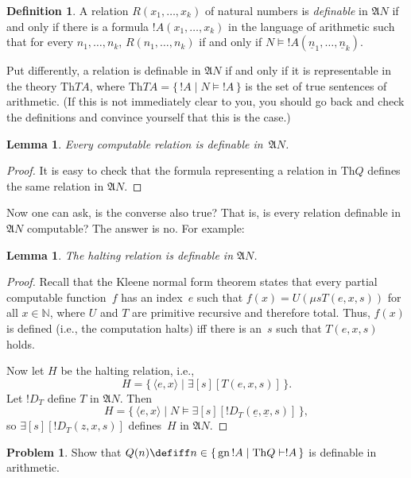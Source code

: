\documentclass[10pt,a4paper]{article}
\theoremstyle{plain}
\newtheorem{lem}[thm]{Lemma}
\theoremstyle{definition}
\newtheorem{defn}[thm]{Definition}
\newtheorem{prob}{Problem}[section]
\theoremstyle{remark}
\providecommand{\lexists}{\mathord{\exists}}
\providecommand{\Proves}{\mathrel{\vdash}}
\providecommand{\Struct}{\ensuremath{\mathfrak{A}}}
\providecommand{\Sat}[2]{\ensuremath{#1 \models #2}}
\providecommand{\Th}{\ensuremath{\mathrm{Th}}}
\providecommand{\tuple}[1]{\langle #1 \rangle}
\providecommand{\num}[1]{\underline{#1}}
\providecommand{\Nat}{\ensuremath{\mathbb{N}}}
\providecommand{\Setabs}[2]{\{\, #1 \mid #2 \,\}}
\providecommand{\Gn}{\operatorname{gn}}
\providecommand{\umin}{\mu}
\begin{document}
\begin{defn}
A relation $R(x_1,\dots,x_k)$ of natural numbers is \emph{definable}
in $\Struct{N}$ if and only if there is a formula $!A(x_1,\dots,x_k)$
in the language of arithmetic such that for every $n_1,\dots,n_k$,
$R(n_1,\dots,n_k)$ if and only if $\Sat{N}{!A(\num n_1,\dots,\num
  n_k)}$.
\end{defn}

Put differently, a relation is definable in $\Struct{N}$ if and
only if it is representable in the theory $\Th{TA}$, where $\Th{TA} =
\Setabs{!A}{\Sat{N}{!A}}$ is the set of true sentences of
arithmetic. (If this is not immediately clear to you, you should go
back and check the definitions and convince yourself that this is the
case.)

\begin{lem}
Every computable relation is definable in~$\Struct{N}$.
\end{lem}

\begin{proof}
It is easy to check that the formula representing a relation in
$\Th{Q}$ defines the same relation in $\Struct{N}$. 
\end{proof}

Now one can ask, is the converse also true?  That is, is every
relation definable in~$\Struct{N}$ computable? The answer is no. For
example:

\begin{lem}
The halting relation is definable in $\Struct{N}$.
\end{lem}

\begin{proof}
Recall that the Kleene normal form theorem states that every partial
computable function~$f$ has an index~$e$ such that $f(x) =
U(\umin{s}{T(e,x,s)})$ for all $x \in \Nat$, where $U$ and $T$ are
primitive recursive and therefore total. Thus, $f(x)$ is defined
(i.e., the computation halts) iff there is an~$s$ such that $T(e,x,s)$
holds.

Now let $H$ be the halting relation, i.e.,
\[
H = \Setabs{\tuple{e,x}}{\lexists[s][T(e, x, s)]}.
\]
Let $!D_T$ define $T$ in $\Struct{N}$. Then
\[
H = \Setabs{\tuple{e,x}}{\Sat{N}{\lexists[s][!D_T(\num e, \num x, s)]}},
\]
so $\lexists[s][!D_T(z, x, s)]$ defines~$H$ in $\Struct{N}$. 
\end{proof}

\begin{prob}
Show that $Q(n) \defiff n \in \Setabs{\Gn{!A}}{\Th{Q} \Proves !A}$ is
  definable in arithmetic.
\end{prob}
\end{document}
